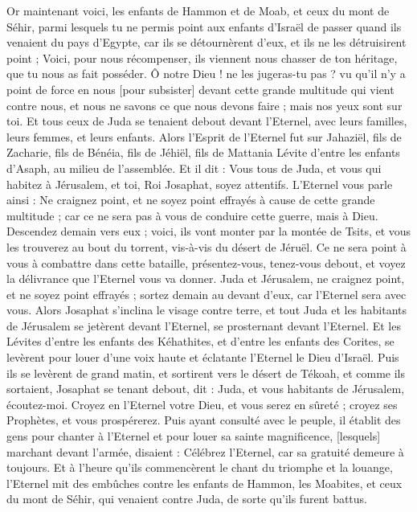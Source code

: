 \begin{multicols}{2}
Or maintenant voici, les enfants de Hammon et de Moab, et ceux du mont de Séhir, parmi lesquels tu ne permis point aux enfants d'Israël de passer quand ils venaient du pays d'Egypte, car ils se détournèrent d'eux, et ils ne les détruisirent point ;
Voici, pour nous récompenser, ils viennent nous chasser de ton héritage, que tu nous as fait posséder.
Ô notre Dieu ! ne les jugeras-tu pas ? vu qu'il n'y a point de force en nous [pour subsister] devant cette grande multitude qui vient contre nous, et nous ne savons ce que nous devons faire ; mais nos yeux sont sur toi.
Et tous ceux de Juda se tenaient debout devant l'Eternel, avec leurs familles, leurs femmes, et leurs enfants.
Alors l'Esprit de l'Eternel fut sur Jahaziël, fils de Zacharie, fils de Bénéia, fils de Jéhiël, fils de Mattania Lévite d'entre les enfants d'Asaph, au milieu de l'assemblée.
Et il dit : Vous tous de Juda, et vous qui habitez à Jérusalem, et toi, Roi Josaphat, soyez attentifs. L'Eternel vous parle ainsi : Ne craignez point, et ne soyez point effrayés à cause de cette grande multitude ; car ce ne sera pas à vous de conduire cette guerre, mais à Dieu.
Descendez demain vers eux ; voici, ils vont monter par la montée de Tsits, et vous les trouverez au bout du torrent, vis-à-vis du désert de Jéruël.
Ce ne sera point à vous à combattre dans cette bataille, présentez-vous, tenez-vous debout, et voyez la délivrance que l'Eternel vous va donner. Juda et Jérusalem, ne craignez point, et ne soyez point effrayés ; sortez demain au devant d'eux, car l'Eternel sera avec vous.
Alors Josaphat s'inclina le visage contre terre, et tout Juda et les habitants de Jérusalem se jetèrent devant l'Eternel, se prosternant devant l'Eternel.
Et les Lévites d'entre les enfants des Kéhathites, et d'entre les enfants des Corites, se levèrent pour louer d'une voix haute et éclatante l'Eternel le Dieu d'Israël.
Puis ils se levèrent de grand matin, et sortirent vers le désert de Tékoah, et comme ils sortaient, Josaphat se tenant debout, dit : Juda, et vous habitants de Jérusalem, écoutez-moi. Croyez en l'Eternel votre Dieu, et vous serez en sûreté ; croyez ses Prophètes, et vous prospérerez.
Puis ayant consulté avec le peuple, il établit des gens pour chanter à l'Eternel et pour louer sa sainte magnificence, [lesquels] marchant devant l'armée, disaient : Célébrez l'Eternel, car sa gratuité demeure à toujours.
Et à l'heure qu'ils commencèrent le chant du triomphe et la louange, l'Eternel mit des embûches contre les enfants de Hammon, les Moabites, et ceux du mont de Séhir, qui venaient contre Juda, de sorte qu'ils furent battus.

\end{multicols}
